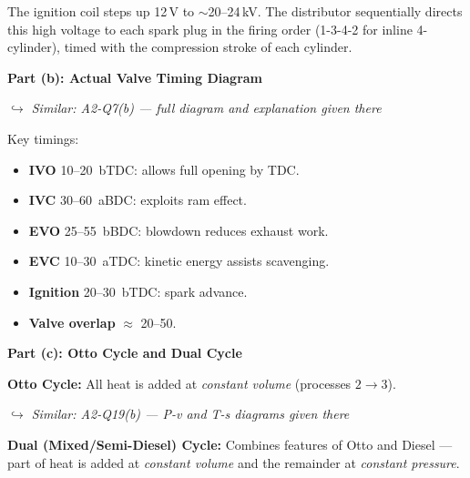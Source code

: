 \documentclass[12pt,a3paper]{article}
\newcommand{\variant}[1]{\par\vspace{1pt}\textcolor{blue!50!black}%
  {\footnotesize\textit{$\hookrightarrow$ Similar: #1}}}
\begin{document}
\begin{enumerate}
\begin{tcolorbox}[enhanced,breakable,ansbox,colback=cB!4,colframe=cB,
  boxrule=0.8pt,arc=5pt,
  title={\textbf{Answer}},fonttitle=\bfseries\color{white},colbacktitle=cB]
The ignition coil steps up 12\,V to $\sim$20--24\,kV. The distributor
sequentially directs this high voltage to each spark plug in the firing order
(1-3-4-2 for inline 4-cylinder), timed with the compression stroke of each
cylinder.

\hrulefill

\textbf{Part (b): Actual Valve Timing Diagram}

\variant{A2-Q7(b) — full diagram and explanation given there}

Key timings:
\begin{itemize}[leftmargin=1.5em,itemsep=1pt]
  \item \textbf{IVO} 10--20\textdegree\ bTDC: allows full opening by TDC.
  \item \textbf{IVC} 30--60\textdegree\ aBDC: exploits ram effect.
  \item \textbf{EVO} 25--55\textdegree\ bBDC: blowdown reduces exhaust work.
  \item \textbf{EVC} 10--30\textdegree\ aTDC: kinetic energy assists scavenging.
  \item \textbf{Ignition} 20--30\textdegree\ bTDC: spark advance.
  \item \textbf{Valve overlap} $\approx$ 20--50\textdegree.
\end{itemize}

\hrulefill

\textbf{Part (c): Otto Cycle and Dual Cycle}

\textbf{Otto Cycle:}
All heat is added at \emph{constant volume} (processes $2\to3$).
\variant{A2-Q19(b) — P-v and T-s diagrams given there}

\textbf{Dual (Mixed/Semi-Diesel) Cycle:} Combines features of Otto and Diesel
— part of heat is added at \emph{constant volume} and the remainder at
\emph{constant pressure}.


\end{tcolorbox}
\end{enumerate}
\end{document}
